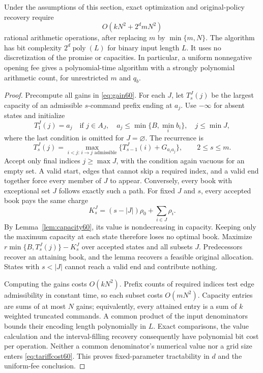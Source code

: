 \begin{theorem}\label{thm:tariff60}
Under the assumptions of this section, exact optimization and original-policy recovery require
\begin{equation}\label{eq:tariffcost60}
 O(kN^2+2^d mN^2)
\end{equation}
rational arithmetic operations, after replacing $m$ by $\min\{m,N\}$. The algorithm has bit complexity $2^d\operatorname{poly}(L)$ for binary input length $L$. It uses no discretization of the promise or capacities. In particular, a uniform nonnegative opening fee gives a polynomial-time algorithm with a strongly polynomial arithmetic count, for unrestricted $m$ and $q_b$.
\end{theorem}
\begin{proof}
Precompute all gains in \eqref{eq:gain60}. For each $J$, let $T^J_s(j)$ be the largest capacity of an admissible $s$-command prefix ending at $a_j$. Use $-\infty$ for absent states and initialize
\[
 T^J_1(j)=a_j
 \quad\text{if }j\in A_J,\quad a_j\leq\min\{B,\min_i b_i\},
 \quad j\leq\min J,
\]
where the last condition is omitted for $J=\varnothing$. The recurrence is
\begin{equation}\label{eq:tariffdp60}
 T^J_s(j)=\max_{i<j:\,i\to j\text{ admissible}}
       \{T^J_{s-1}(i)+G_{a_i a_j}\},\qquad 2\leq s\leq m.
\end{equation}
Accept only final indices $j\geq\max J$, with the condition again vacuous for an empty set. A valid start, edges that cannot skip a required index, and a valid end together force every member of $J$ to appear. Conversely, every book with exceptional set $J$ follows exactly such a path. For fixed $J$ and $s$, every accepted book pays the same charge
\[
 K^J_s=(s-|J|)\rho_0+\sum_{i\in J}\rho_i.
\]
By Lemma~\ref{lem:capacity60}, its value is nondecreasing in capacity. Keeping only the maximum capacity at each state therefore loses no optimal book. Maximize $r\min\{B,T^J_s(j)\}-K^J_s$ over accepted states and all subsets $J$. Predecessors recover an attaining book, and the lemma recovers a feasible original allocation. States with $s<|J|$ cannot reach a valid end and contribute nothing.

Computing the gains costs $O(kN^2)$. Prefix counts of required indices test edge admissibility in constant time, so each subset costs $O(mN^2)$. Capacity entries are sums of at most $N$ gains; equivalently, every attained entry is a sum of $k$ weighted truncated commands. A common product of the input denominators bounds their encoding length polynomially in $L$. Exact comparisons, the value calculation and the interval-filling recovery consequently have polynomial bit cost per operation. Neither a common denominator's numerical value nor a grid size enters \eqref{eq:tariffcost60}. This proves fixed-parameter tractability in $d$ and the uniform-fee conclusion.
\end{proof}

